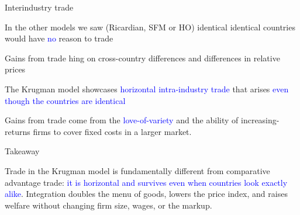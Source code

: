 \documentclass[notes,11pt, aspectratio=169, xcolor=table]{beamer}
\newcommand{\blue}[1]{\textcolor{blue}{#1}}
\newenvironment{wideitemize}{\itemize\addtolength{\itemsep}{10pt}}{\enditemize}
\begin{document}
\begin{frame}{Interindustry trade}

\begin{wideitemize}
    \item In the other models we saw (Ricardian, SFM or HO) identical identical countries would have \blue{no} reason to trade

    \item Gains from trade hing on cross-country differences and differences in relative prices

    \item The Krugman model showcases \blue{horizontal intra-industry trade} that arises \blue{even though the countries are identical}
    
    \item Gains from trade come from the \blue{love-of-variety} and the ability of increasing-returns firms to cover fixed costs in a larger market.
    
\end{wideitemize}
    
\end{frame}

\begin{frame}{Takeaway}

Trade in the Krugman model is fundamentally different from comparative advantage trade: \blue{it is horizontal and survives even when countries look exactly alike}.  Integration doubles the menu of goods, lowers the price index, and raises welfare without changing firm size, wages, or the markup.

    
\end{frame}





\end{document}

